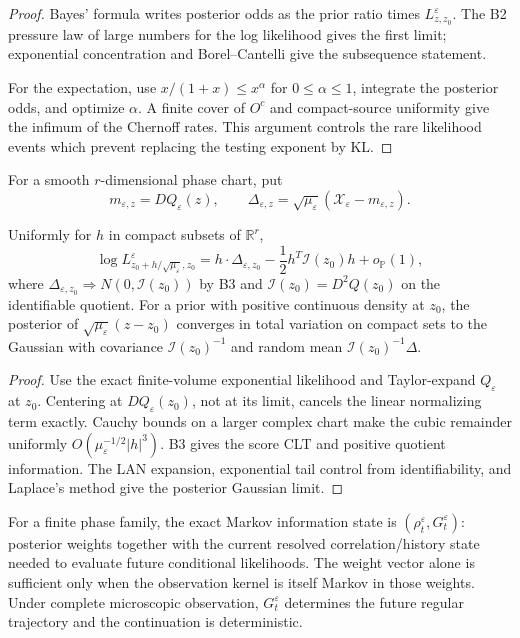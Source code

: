 \begin{proof}
Bayes' formula writes posterior odds as the prior ratio times
\(L_{z,z_0}^\varepsilon\).  The B2 pressure law of large numbers for the log
likelihood gives the first limit; exponential concentration and
Borel--Cantelli give the subsequence statement.

For the expectation, use
\(x/(1+x)\le x^\alpha\) for \(0\le\alpha\le1\), integrate the posterior odds,
and optimize \(\alpha\).  A finite cover of \(O^c\) and compact-source
uniformity give the infimum of the Chernoff rates.  This argument controls the
rare likelihood events which prevent replacing the testing exponent by KL.
\end{proof}

For a smooth \(r\)-dimensional phase chart, put
\[
 m_{\varepsilon,z}=DQ_\varepsilon(z),
 \qquad
 \Delta_{\varepsilon,z}
 =\sqrt{\mu_\varepsilon}
 (\mathcal X_\varepsilon-m_{\varepsilon,z}).
\]

\begin{theorem}
\label{thm:r4-c1-lan}
Uniformly for \(h\) in compact subsets of \(\mathbb R^r\),
\[
 \log L_{z_0+h/\sqrt{\mu_\varepsilon},z_0}^\varepsilon
 =h\cdot\Delta_{\varepsilon,z_0}
 -\frac12h^T\mathcal I(z_0)h+o_{\mathbb P}(1),
\]
where \(\Delta_{\varepsilon,z_0}\Rightarrow
N(0,\mathcal I(z_0))\) by B3 and
\(\mathcal I(z_0)=D^2Q(z_0)\) on the identifiable quotient.  For a prior with
positive continuous density at \(z_0\), the posterior of
\(\sqrt{\mu_\varepsilon}(z-z_0)\) converges in total variation on compact
sets to the Gaussian with covariance \(\mathcal I(z_0)^{-1}\) and random mean
\(\mathcal I(z_0)^{-1}\Delta\).
\end{theorem}

\begin{proof}
Use the exact finite-volume exponential likelihood and Taylor-expand
\(Q_\varepsilon\) at \(z_0\).  Centering at
\(DQ_\varepsilon(z_0)\), not at its limit, cancels the linear normalizing
term exactly.  Cauchy bounds on a larger complex chart make the cubic remainder
uniformly \(O(\mu_\varepsilon^{-1/2}|h|^3)\).  B3 gives the score CLT and
positive quotient information.  The LAN expansion, exponential tail control
from identifiability, and Laplace's method give the posterior Gaussian limit.
\end{proof}

For a finite phase family, the exact Markov information state is
\((\rho_t^\varepsilon,G_t^\varepsilon)\): posterior weights together with the
current resolved correlation/history state needed to evaluate future
conditional likelihoods.  The weight vector alone is sufficient only when the
observation kernel is itself Markov in those weights.  Under complete
microscopic observation, \(G_t^\varepsilon\) determines the future regular
trajectory and the continuation is deterministic.

